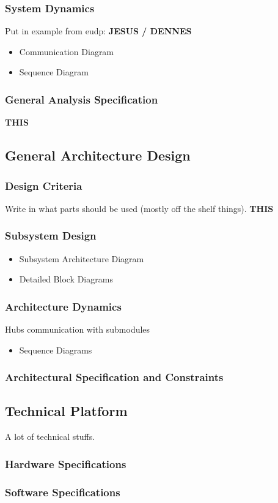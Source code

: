 	\subsubsection{System Dynamics}
			Put in example from eudp: %
			 \textbf{JESUS / DENNES}
		\begin{itemize}
			\item Communication Diagram
			\item Sequence Diagram
		\end{itemize}
	\subsubsection{General Analysis Specification}
		 \textbf{THIS}
\subsection{General Architecture Design}
	\subsubsection{Design Criteria}
		Write in what parts should be used (mostly off the shelf things).  \textbf{THIS}
	\subsubsection{Subsystem Design}
		\begin{itemize}
			\item Subsystem Architecture Diagram
			\item Detailed Block Diagrams
		\end{itemize}
	\subsubsection{Architecture Dynamics}
		Hubs communication with submodules
		\begin{itemize}
			\item Sequence Diagrams
		\end{itemize}
	\subsubsection{Architectural Specification and Constraints}
\subsection{Technical Platform}
	A lot of technical stuffs. 
	\subsubsection{Hardware Specifications}
	\subsubsection{Software Specifications}